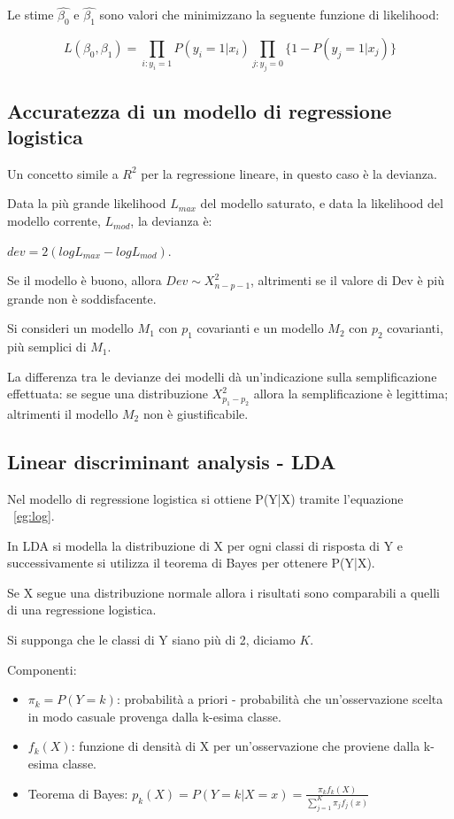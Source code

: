 Le stime $\hat{\beta_0}$ e $\hat{\beta_1}$ sono valori che minimizzano
la seguente funzione di likelihood:

\begin{equation}
L(\beta_0, \beta_1) = \prod_{i:y_i = 1} P(y_i=1|x_i)
\prod_{j:y_j = 0} \{1 - P(y_j=1|x_j)\}
\end{equation}

\subsection{Accuratezza di un modello di regressione logistica}

Un concetto simile a $R^2$ per la regressione lineare, in questo caso è la
devianza.

Data la più grande likelihood $L_{max}$ del modello saturato, e data la
likelihood del modello corrente, $L_{mod}$, la devianza è:

$dev = 2(log L_{max} - log L_{mod})$.

Se il modello è buono, allora $Dev \sim X^2_{n-p-1}$, altrimenti se il valore
di Dev è più grande non è soddisfacente.

Si consideri un modello $M_1$ con $p_1$ covarianti e un modello $M_2$ con
$p_2$ covarianti, più semplici di $M_1$.

La differenza tra le devianze dei modelli dà un'indicazione sulla semplificazione
effettuata: se segue una distribuzione $X^2_{p_1 - p_2}$ allora la semplificazione
è legittima; altrimenti il modello $M_2$ non è giustificabile.

\subsection{Linear discriminant analysis - LDA}

Nel modello di regressione logistica si ottiene P(Y|X) tramite l'equazione
~\ref{eg:log}.

In LDA si modella la distribuzione di X per ogni classi di risposta di Y e
successivamente si utilizza il teorema di Bayes per ottenere P(Y|X).

Se X segue una distribuzione normale allora i risultati sono comparabili a
quelli di una regressione logistica.

Si supponga che le classi di Y siano più di 2, diciamo $K$.

Componenti:

\begin{itemize}
 \item $\pi_k = P(Y = k)$: probabilità a priori - probabilità che un'osservazione
scelta in modo casuale provenga dalla k-esima classe.
 \item $f_k(X)$: funzione di densità di X per un'osservazione che proviene dalla
k-esima classe.
 \item Teorema di Bayes: $p_k(X) = P(Y = k|X = x) =
\frac{\pi_kf_k(X)}{\sum_{j=1}^K \pi_jf_j(x)}$
\end{itemize}

